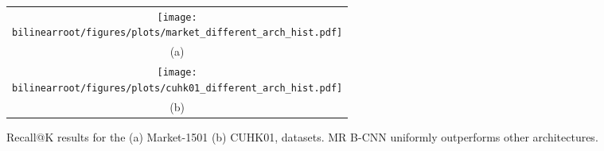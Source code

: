 \begin{figure*}
\begin{center}
    

\begin{tabular}{c}
\texttt{[image: \\bilinearroot/figures/plots/market\_different\_arch\_hist.pdf]}\\
(a) \\
\texttt{[image: \\bilinearroot/figures/plots/cuhk01\_different\_arch\_hist.pdf]}\\
(b) \\
\end{tabular}
\caption{Recall@K results for the (a) Market-1501 (b) CUHK01, datasets. MR B-CNN uniformly outperforms other architectures.}
\label{fig:recall}
\end{center}
\end{figure*}

